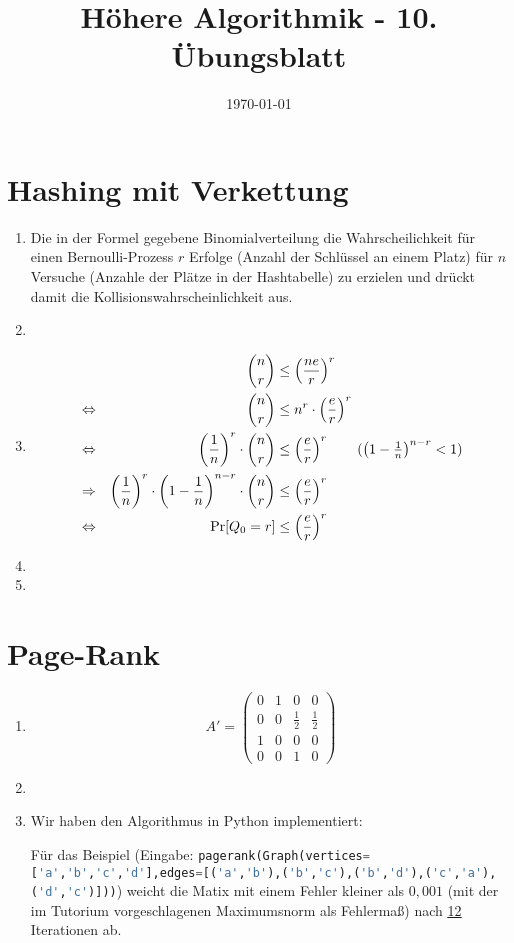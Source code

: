 \documentclass[a4paper,10pt]{article}
\title{H\"ohere Algorithmik - 10. \"Ubungsblatt}
\author{\Authors}
\date{\today}
\begin{document}
\maketitle

\section{Hashing mit Verkettung}
\begin{enumerate}
\item   Die in der Formel gegebene Binomialverteilung die Wahrscheilichkeit für einen Bernoulli-Prozess $r$ Erfolge (Anzahl der Schlüssel an einem Platz) für $n$ Versuche (Anzahle der Plätze in der Hashtabelle) zu erzielen und drückt damit die Kollisionswahrscheinlichkeit aus.
\item   
\item   \begin{align*}
	&&\binom{n}{r} &\leq \left( \frac{ne}{r} \right)^r \\
	&\Leftrightarrow &\binom{n}{r} &\leq n^r \cdot \left( \frac{e}{r} \right)^r \\
	&\Leftrightarrow& \left( \frac{1}{n} \right)^r \cdot \binom{n}{r} &\leq \left( \frac{e}{r} \right)^r \tag{$\left( 1 - \frac{1}{n} \right)^{n-r} < 1$} \\
	&\Rightarrow &\left( \frac{1}{n} \right)^r \cdot \left( 1 - \frac{1}{n} \right)^{n-r} \cdot \binom{n}{r} &\leq \left( \frac{e}{r} \right)^r \\
	&\Leftrightarrow &\text{Pr[$Q_0 = r$]} &\leq \left( \frac{e}{r} \right)^r
        \end{align*}
\item   
\item   
\end{enumerate}

\section{Page-Rank}
\begin{enumerate}
\item   \[
            A' = \begin{pmatrix}
                0 & 1 & 0 & 0 \\
                0 & 0 & \frac{1}{2} & \frac{1}{2} \\
                1 & 0 & 0 & 0 \\
                0 & 0 & 1 & 0
            \end{pmatrix}
        \]
\item   
\item   Wir haben den Algorithmus in Python implementiert:
        
        Für das Beispiel (Eingabe: \lstinline[language=Python]!pagerank(Graph(vertices=['a','b','c','d'],edges=[('a','b'),('b','c'),('b','d'),('c','a'),('d','c')]))!) weicht die Matix mit einem Fehler kleiner als $0{,}001$ (mit der im Tutorium vorgeschlagenen Maximumsnorm als Fehlermaß) nach \underline{\underline{12}} Iterationen ab.
\end{enumerate}
\end{document}

